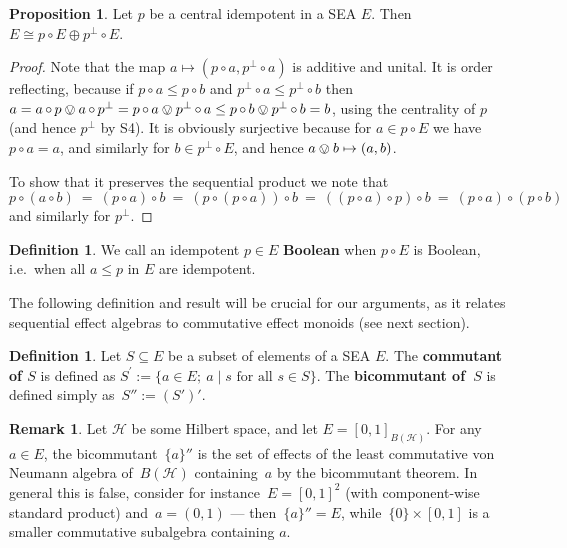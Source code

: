 \documentclass[a4paper, onecolumn, accepted=2020-12-22]{quantumarticle}
\newcommand\Define[1]{\textbf{#1}}
\newcommand{\mult}{\mathop{\circ}}
\newcommand{\commu}{\mathrel{\lvert}}
\newcounter{counter}
\theoremstyle{definition}
\newtheorem{proposition}[counter]{Proposition}
\newtheorem{definition}[counter]{Definition}
\newtheorem{remark}[counter]{Remark}
\begin{document}
\begin{proposition}\label{prop:central-splits}
    Let $p$ be a central idempotent in a SEA $E$. Then $E\cong p\mult E \oplus p^\perp \mult E$.
\end{proposition}
\begin{proof}
    Note that the map $a\mapsto (p\mult a, p^\perp \mult a)$ is
    additive and unital. It is order reflecting, because if $p\mult
    a \leq p\mult b$ and $p^\perp \mult a \leq p^\perp \mult b$
    then $a=a\mult p \ovee a\mult p^\perp = p\mult a \ovee p^\perp
    \mult a \leq p\mult b \ovee p^\perp\mult b = b$, using the
    centrality of $p$ (and hence $p^\perp$ by S4). It is obviously
    surjective because for $a\in p\mult E$ we have $p\mult a = a$,
    and similarly for $b\in p^\perp \mult E$, and hence $a\ovee b
    \mapsto (a,b)$.

    To show that it preserves the sequential product we note that 
    \begin{equation*}
    p\mult (a\mult b) \ =\  (p\mult a)\mult b \ =\  (p\mult (p\mult
    a))\mult b  \ =\  ((p\mult a)\mult p)\mult b \ = \  (p\mult
    a)\mult (p\mult b)
    \end{equation*}
    and similarly for $p^\perp$.
\end{proof}

\begin{definition}
    We call an idempotent $p\in E$ \Define{Boolean} when $p\mult E$ is Boolean, i.e.~when all $a\leq p$ in $E$ are idempotent.
\end{definition}

The following definition and result will be crucial for our arguments, as it relates sequential effect algebras to commutative effect monoids (see next section).

\begin{definition}
    Let $S\subseteq E$ be a subset of elements of a SEA $E$.
        The \Define{commutant of $S$}
            is defined as $S^\prime := \{a\in E;\ 
                    a \commu s \text{ for all } s \in S \}$.
    The \Define{bicommutant of~$S$} is
        defined simply as~$S'' := (S')'$.
\end{definition}

\begin{remark}
    Let $\mathscr{H}$ be some Hilbert space, and
    let $E=[0,1]_{B(\mathscr{H})}$.
    For any $a\in E$, the bicommutant~$\{a\}''$ 
    is the set of effects of the least 
    commutative von Neumann algebra of~$B(\mathscr{H})$ containing~$a$
    by the bicommutant theorem.
In general this is false,
    consider for instance~$E=[0,1]^2$ (with component-wise standard product)
    and~$a = (0,1)$
    --- then~$\{a\}'' = E$, while~$\{0\}\times [0,1]$
    is a smaller commutative subalgebra containing $a$.
\end{remark}
\end{document}

